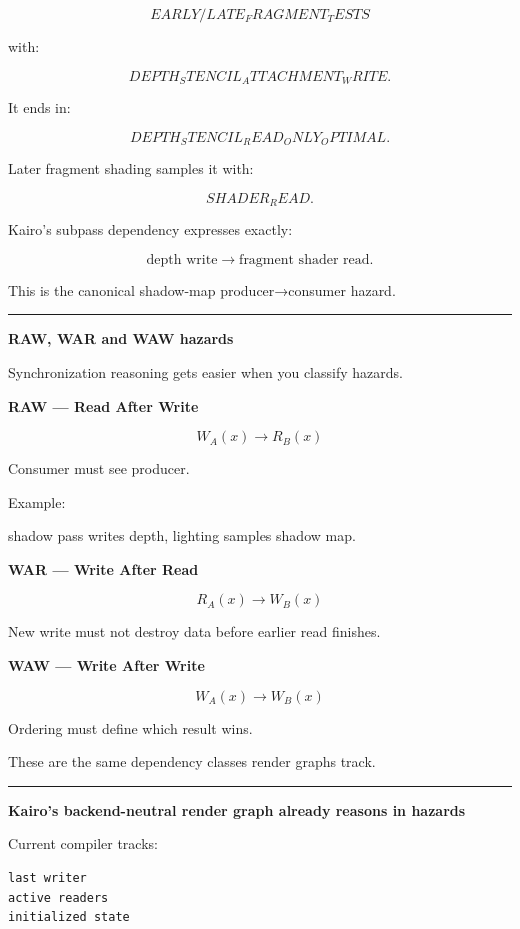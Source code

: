 \[
EARLY/LATE_FRAGMENT_TESTS
\]

with:

\[
DEPTH_STENCIL_ATTACHMENT_WRITE.
\]

It ends in:

\[
DEPTH_STENCIL_READ_ONLY_OPTIMAL.
\]

Later fragment shading samples it with:

\[
SHADER_READ.
\]

Kairo's subpass dependency expresses exactly:

\[
\text{depth write}
\rightarrow
\text{fragment shader read}.
\]

This is the canonical shadow-map producer→consumer hazard.

\begin{center}\rule{0.5\linewidth}{0.5pt}\end{center}

\textbf{RAW, WAR and WAW hazards}

Synchronization reasoning gets easier when you classify hazards.

\textbf{RAW --- Read After Write}

\[
W_A(x)
\rightarrow
R_B(x)
\]

Consumer must see producer.

Example:

shadow pass writes depth, lighting samples shadow map.

\textbf{WAR --- Write After Read}

\[
R_A(x)
\rightarrow
W_B(x)
\]

New write must not destroy data before earlier read finishes.

\textbf{WAW --- Write After Write}

\[
W_A(x)
\rightarrow
W_B(x)
\]

Ordering must define which result wins.

These are the same dependency classes render graphs track.

\begin{center}\rule{0.5\linewidth}{0.5pt}\end{center}

\textbf{Kairo's backend-neutral render graph already reasons in hazards}

Current  compiler tracks:

\begin{verbatim}
last writer
active readers
initialized state
\end{verbatim}


